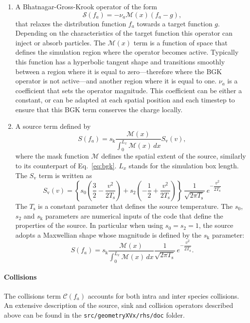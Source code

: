 \documentclass[11pt]{article}
\begin{document}
\begin{enumerate}
  \item A Bhatnagar-Gross-Krook operator \cite{Bhatnagar1954} of the form
    \begin{equation}\label{eq:bgk}
    \mathcal{S}(f_a) = - \nu_{a}\mathcal{M}(x)  \left( f_a - g \right),
  \end{equation}
that relaxes the distribution function $f_a$ towards a target function $g$. Depending on the characteristics of the target function this operator can inject or absorb particles. The $\mathcal{M}(x)$ term is a function of space that defines the simulation region where the operator becomes active. Typically this function has a hyperbolic tangent shape and transitions smoothly between a region where it is equal to zero---therefore where the BGK operator is not active---and another region where it is equal to one. $\nu_{a}$ is a coefficient that sets the operator magnitude. This coefficient can be either a constant, or can be adapted at each spatial position and each timestep to ensure that this BGK term conserves the charge locally.
%
\item A source term \cite[Appendix A]{Sarazin2011} defined by
%
\begin{equation}\label{eq:general_form}
   S(f_a) = s_\mathrm{k} \dfrac{\mathcal{M}(x)}{\int_{0}^{L_x} \mathcal{M}(x) \, dx} S_\mathrm{v}(v),
\end{equation}
%
where the mask function $\mathcal{M}$ defines the spatial extent of the source, similarly to its counterpart of Eq.~\ref{eq:bgk}. $L_x$ stands for the simulation box length. The  $S_\mathrm{v}$ term is written as
%
\begin{equation}\label{eq:sv_expression}
  S_\mathrm{v}(v) = \left\{ s_0\left( \dfrac{3}{2} - \dfrac{v^2}{2 T_\mathrm{s}} \right) + s_2 \left( -\dfrac{1}{2} + \dfrac{v^2}{2 T_\mathrm{s}} \right)  \right\} \, \dfrac{1}{\sqrt{2 \pi  T_\mathrm{s}} } \, e^{- \dfrac{v^2}{2 T_\mathrm{s}}}
\end{equation}
%
 The $T_\mathrm{s}$ is a constant parameter that defines the source temperature. The  $s_0$, $s_2$ and $s_\mathrm{k}$ parameters are numerical inputs of the code that define the properties of the source. In particular when using $s_0 = s_2 = 1$, the source adopts a Maxwellian shape whose magnitude is defined by the $s_\mathrm{k}$ parameter:
%
%
\begin{equation}
  S(f_a) = s_\mathrm{k} \dfrac{\mathcal{M}(x)}{\int_{0}^{L_x} \mathcal{M}(x) \, dx}\dfrac{1}{\sqrt{2\pi T_\mathrm{s}}} \, e^{- \dfrac{v^2}{2 T_\mathrm{s}}}.
\end{equation}
%
\end{enumerate}
%
\paragraph{Collisions} The collisions term $\mathcal{C}(f_a)$ accounts for both intra and inter species collisions. \\

\noindent An extensive description of the source, sink and collision operators described above can be found in the \texttt{src/geometryXVx/rhs/doc} folder. 
  \clearpage
  \printbibliography
\end{document}
